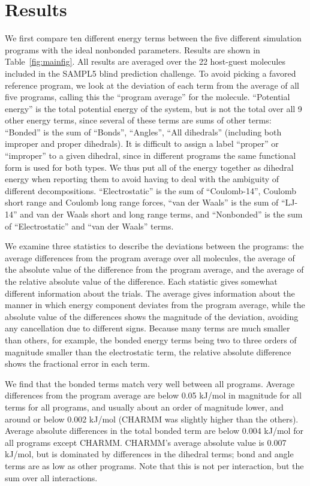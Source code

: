 \section*{Results}
We first compare ten different energy terms between the five different
simulation programs with the ideal nonbonded parameters.  Results are
shown in Table~\ref{fig:mainfig}. All results are averaged over the 22
host-guest molecules included in the SAMPL5 blind prediction
challenge. To avoid picking a favored reference program, we look at
the deviation of each term from the average of all five programs,
calling this the ``program average'' for the molecule.  ``Potential
energy'' is the total potential energy of the system, but is not the
total over all 9 other energy terms, since several of these terms are
sums of other terms: ``Bonded'' is the sum of ``Bonds'', ``Angles'',
``All dihedrals'' (including both improper and proper dihedrals). 
It is difficult to assign a label ``proper'' or ``improper'' to a
given dihedral, since in different programs the same functional form
is used for both types. We thus put all of the energy together as
dihedral energy when reporting them to avoid having to deal with the
ambiguity of different decompositions.
``Electrostatic'' is the sum of ``Coulomb-14'', Coulomb short range
and Coulomb long range forces, ``van der Waals'' is the sum of
``LJ-14'' and van der Waals short and long range terms, and
``Nonbonded'' is the sum of ``Electrostatic'' and ``van der Waals''
terms.

We examine three statistics to describe the deviations between the
programs: the average differences from the program average over all
molecules, the average of the absolute value of the difference from
the program average, and the average of the relative absolute value of
the difference. Each statistic gives somewhat different information
about the trials. The average gives information about the manner in
which energy component deviates from the program average, while the
absolute value of the differences shows the magnitude of the
deviation, avoiding any cancellation due to different signs.  Because
many terms are much smaller than others, for example, the bonded
energy terms being two to three orders of magnitude smaller than the
electrostatic term, the relative absolute difference shows the
fractional error in each term.

We find that the bonded terms match very well between all
programs. Average differences from the program average are below 0.05
kJ/mol in magnitude for all terms for all programs, and usually about
an order of magnitude lower, and around or below 0.002 kJ/mol (CHARMM
was slightly higher than the others). Average absolute differences in
the total bonded term are below 0.004 kJ/mol for all programs except
CHARMM. CHARMM's average absolute value is 0.007 kJ/mol, but is
dominated by differences in the dihedral terms; bond and angle terms
are as low as other programs.  Note that this is not per interaction,
but the sum over all interactions.

